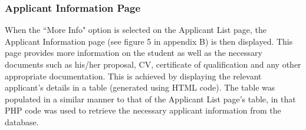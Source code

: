 \documentclass[journal]{IEEEtran}
\begin{document}
\hfill \break \subsubsection{Applicant Information Page}
When the ``More Info" option is selected on the Applicant List page, the Applicant Information page (see figure 5 in appendix B) is then displayed. This page provides more information on the student as well as the necessary documents such as his/her proposal, CV, certificate of qualification and any other appropriate documentation. This is achieved by displaying the relevant applicant's details in a table (generated using HTML code). The table was populated in a similar manner to that of the Applicant List page's table, in that PHP code was used to retrieve the necessary applicant information from the database.


\end{document}
